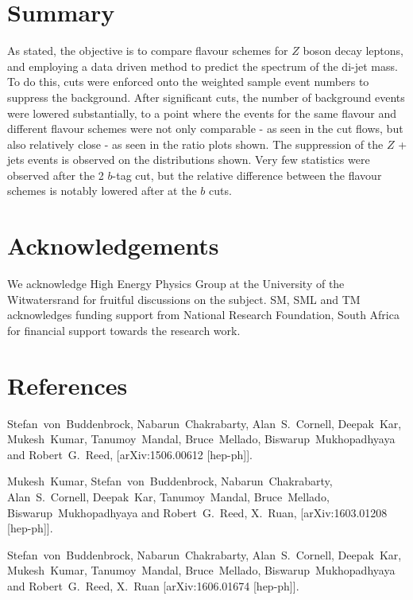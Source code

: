 \documentclass[a4paper]{jpconf}
\begin{document}
\section{Summary}
\label{summ}
As stated, the objective is to compare flavour schemes for $Z$ boson decay leptons, and employing a data driven method to predict the spectrum of the di-jet mass. To do this, cuts were enforced onto the weighted sample event numbers to suppress the background. After significant cuts, the number of background events were lowered substantially, to a point where the events for the same flavour and different flavour schemes were not only comparable - as seen in the cut flows, but also relatively close - as seen in the ratio plots shown. The suppression of the $Z$ + jets events is observed on the distributions shown.  Very few statistics were observed after the 2 $b$-tag cut, but the relative difference between the flavour schemes is notably lowered after at the $b$ cuts. 
  

\section*{Acknowledgements}
We acknowledge High Energy Physics Group at the University of the Witwatersrand for fruitful discussions on the subject. SM, SML and 
TM acknowledges funding support from National Research Foundation, South Africa for financial support towards the research work.

\section*{References}
\begin{thebibliography}{9}


 Stefan~von~Buddenbrock, Nabarun~Chakrabarty, Alan~S.~Cornell, Deepak~Kar, Mukesh~Kumar,
 Tanumoy~Mandal, Bruce~Mellado, Biswarup~Mukhopadhyaya and Robert~G.~Reed,
  [arXiv:1506.00612 [hep-ph]].
  
   Mukesh~Kumar, Stefan~von~Buddenbrock, Nabarun~Chakrabarty, Alan~S.~Cornell, Deepak~Kar, 
   Tanumoy~Mandal, Bruce~Mellado, Biswarup~Mukhopadhyaya and Robert~G.~Reed, X.~Ruan,
   [arXiv:1603.01208 [hep-ph]].
   
  
  Stefan~von~Buddenbrock, Nabarun~Chakrabarty, Alan~S.~Cornell, Deepak~Kar, Mukesh~Kumar,
  Tanumoy~Mandal, Bruce~Mellado, Biswarup~Mukhopadhyaya and Robert~G.~Reed, X.~Ruan
  [arXiv:1606.01674 [hep-ph]].
       
\end{thebibliography}
\end{document}
